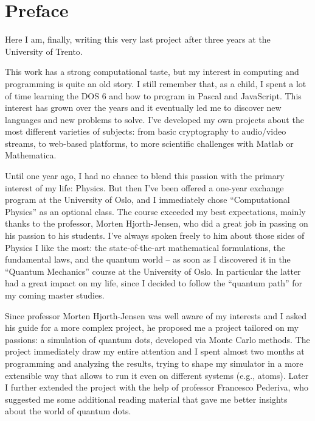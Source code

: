 
\chapter{Preface}

Here I am, finally, writing this very last project after three years at the University of Trento.

This work has a strong computational taste, but my interest in computing and programming is quite an old story. I still remember that, as a child, I spent a lot of time learning the DOS 6 and how to program in Pascal and JavaScript. This interest has grown over the years and it eventually led me to discover new languages and new problems to solve. I've developed my own projects about the most different varieties of subjects: from basic cryptography to audio/video streams, to web-based platforms, to more scientific challenges with Matlab or Mathematica.

Until one year ago, I had no chance to blend this passion with the primary interest of my life: Physics. But then I've been offered a one-year exchange program at the University of Oslo, and I immediately chose ``Computational Physics'' as an optional class. The course exceeded my best expectations, mainly thanks to the professor, Morten Hjorth-Jensen, who did a great job in passing on his passion to his students. I've always spoken freely to him about those sides of Physics I like the most: the state-of-the-art mathematical formulations, the fundamental laws, and the quantum world -- as soon as I discovered it in the ``Quantum Mechanics'' course at the University of Oslo. In particular the latter had a great impact on my life, since I decided to follow the ``quantum path'' for my coming master studies.

Since professor Morten Hjorth-Jensen was well aware of my interests and I asked his guide for a more complex project, he proposed me a project tailored on my passions: a simulation of quantum dots, developed via Monte Carlo methods. The project immediately draw my entire attention and I spent almost two months at programming and analyzing the results, trying to shape my simulator in a more extensible way that allows to run it even on different systems (e.g., atoms). Later I further extended the project with the help of professor Francesco Pederiva, who suggested me some additional reading material that gave me better insights about the world of quantum dots.

